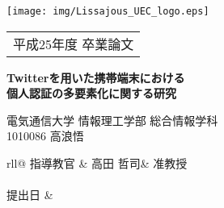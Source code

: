 \thispagestyle{empty}

\noindent
\texttt{[image: img/Lissajous\_UEC\_logo.eps]}\\
\begin{tabular}{c}
{\Large 平成25年度 卒業論文}				\\
\end{tabular}

\vspace{2.5cm}

\begin{center}
\LARGE \bf Twitterを用いた携帯端末における \\
個人認証の多要素化に関する研究 \\
\end{center}

\vspace{1.5cm}

\LARGE
\begin{flushright}
電気通信大学 情報理工学部 総合情報学科\\
1010086 高浪悟\\

\vspace{1.6zh}

{\def\arraystretch{0.6}
\begin{tabular}{rll@{}}
指導教官	& 高田 哲司& 准教授	\\
							\\
提出日	& 	\\
\end{tabular}
}
\end{flushright}
\normalsize
\newpage

